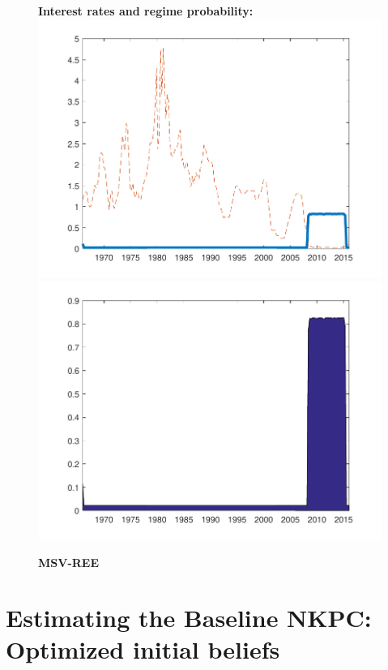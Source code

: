 \documentclass[12pt,reqno]{article}
\numberwithin{equation}{section}
\begin{document}
\begin{figure}[H]
\caption{\large{\textbf{MSV-REE }}}
\vspace{5 mm}

\textbf{Interest rates and regime probability:} \\

\includegraphics[scale=0.6]{NKPC_sigmaPoint_regime.pdf}
\includegraphics[scale=0.6]{NKPC_sigmaPoint_regimeProb.pdf}\\




\end{figure}

\newpage

\section*{Estimating the Baseline NKPC: Optimized initial beliefs} 
\end{document}
